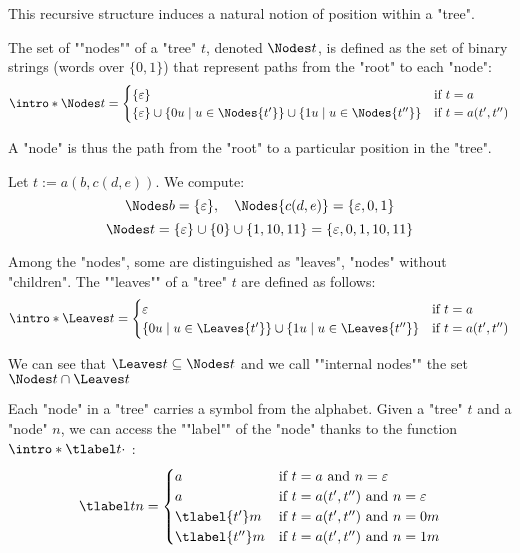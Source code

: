 \documentclass[a4paper,UKenglish,cleveref, autoref, thm-restate]{lipics-v2021}
\begin{document}
This recursive structure induces a natural notion of position within a "tree".

\begin{definition}
	\AP The set of ""nodes"" of a "tree" $t$, denoted $\Nodes t$, is defined as the set of binary strings (words over $\{0,1\}$)
	that represent paths from the "root" to each "node":
	\[
		\intro* \Nodes t =
		\begin{cases}
			\{\varepsilon\}                      & \text{if } t = a          \\
			\{\varepsilon\} \cup \setdef{0u}{u \in \Nodes {t'}}
			\cup \setdef{1u}{u \in \Nodes {t''}} & \text{if } t = a(t', t'')
		\end{cases}
	\]

	A "node" is thus the path from the "root" to a particular position in the "tree".
\end{definition}

\begin{example}
	Let $t := a(b, c(d, e))$. We compute:
	\[
		\Nodes b = \{\varepsilon\}, \quad \Nodes{c(d, e)} = \{\varepsilon, 0, 1\}
	\]
	\[
		\Nodes t = \{\varepsilon\} \cup \{0\} \cup \{1, 10, 11\} = \{\varepsilon, 0, 1, 10, 11\}
	\]
\end{example}


Among the "nodes", some are distinguished as "leaves", "nodes" without "children".
\AP The ""leaves"" of a "tree" $t$ are defined as follows:
\[
	\intro* \Leaves t = \begin{cases}
		\varepsilon                              & \text{if } t = a         \\
		\setdef {0u} {u \in \Leaves {t'}}
		\cup \setdef {1u} {u \in \Leaves {t''} } & \text{if } t = a(t',t'')
	\end{cases}
\]

\AP We can see that $\Leaves t \subseteq \Nodes t $ and we call ""internal nodes"" the set $\Nodes t \cap \Leaves t$


Each "node" in a "tree" carries a symbol from the alphabet.
\AP Given a "tree" $t$ and a "node" $n$, we can access the ""label"" of the "node"
thanks to the function $\intro* \tlabel t {\cdot}$ :
\[
	\tlabel t n =   \begin{cases}
		a               & \text{if } t = a \text{ and } n = \varepsilon         \\
		a               & \text{if } t = a(t',t'') \text{ and } n = \varepsilon \\
		\tlabel {t'} m  & \text{if } t = a(t',t'') \text{ and } n = 0m          \\
		\tlabel {t''} m & \text{if } t = a(t',t'') \text{ and } n = 1m
	\end{cases}
\]
\end{document}
